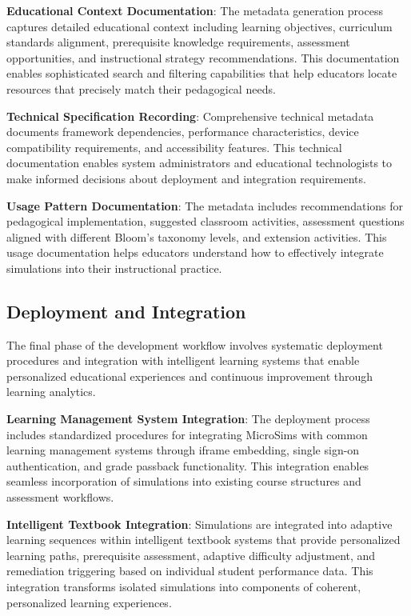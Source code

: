 \textbf{Educational Context Documentation}: The metadata generation process captures detailed educational context including learning objectives, curriculum standards alignment, prerequisite knowledge requirements, assessment opportunities, and instructional strategy recommendations. This documentation enables sophisticated search and filtering capabilities that help educators locate resources that precisely match their pedagogical needs.

\textbf{Technical Specification Recording}: Comprehensive technical metadata documents framework dependencies, performance characteristics, device compatibility requirements, and accessibility features. This technical documentation enables system administrators and educational technologists to make informed decisions about deployment and integration requirements.

\textbf{Usage Pattern Documentation}: The metadata includes recommendations for pedagogical implementation, suggested classroom activities, assessment questions aligned with different Bloom's taxonomy levels, and extension activities. This usage documentation helps educators understand how to effectively integrate simulations into their instructional practice.

\subsection{Deployment and Integration}

The final phase of the development workflow involves systematic deployment procedures and integration with intelligent learning systems that enable personalized educational experiences and continuous improvement through learning analytics.

\textbf{Learning Management System Integration}: The deployment process includes standardized procedures for integrating MicroSims with common learning management systems through iframe embedding, single sign-on authentication, and grade passback functionality. This integration enables seamless incorporation of simulations into existing course structures and assessment workflows.

\textbf{Intelligent Textbook Integration}: Simulations are integrated into adaptive learning sequences within intelligent textbook systems that provide personalized learning paths, prerequisite assessment, adaptive difficulty adjustment, and remediation triggering based on individual student performance data. This integration transforms isolated simulations into components of coherent, personalized learning experiences.

